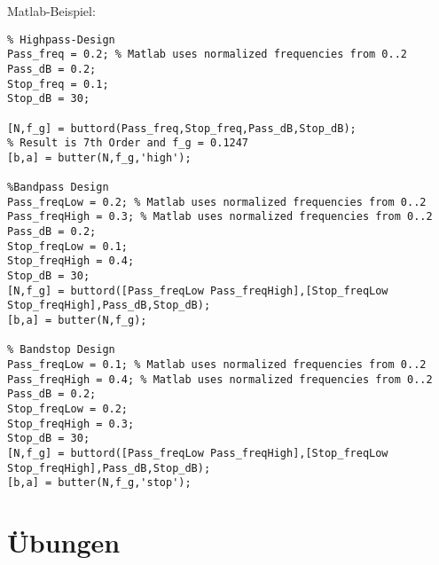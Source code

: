 Matlab-Beispiel:

\begin{verbatim}
% Highpass-Design
Pass_freq = 0.2; % Matlab uses normalized frequencies from 0..2
Pass_dB = 0.2;
Stop_freq = 0.1;
Stop_dB = 30;

[N,f_g] = buttord(Pass_freq,Stop_freq,Pass_dB,Stop_dB);
% Result is 7th Order and f_g = 0.1247
[b,a] = butter(N,f_g,'high');

%Bandpass Design
Pass_freqLow = 0.2; % Matlab uses normalized frequencies from 0..2
Pass_freqHigh = 0.3; % Matlab uses normalized frequencies from 0..2
Pass_dB = 0.2;
Stop_freqLow = 0.1;
Stop_freqHigh = 0.4;
Stop_dB = 30;
[N,f_g] = buttord([Pass_freqLow Pass_freqHigh],[Stop_freqLow Stop_freqHigh],Pass_dB,Stop_dB);
[b,a] = butter(N,f_g);

% Bandstop Design
Pass_freqLow = 0.1; % Matlab uses normalized frequencies from 0..2
Pass_freqHigh = 0.4; % Matlab uses normalized frequencies from 0..2
Pass_dB = 0.2;
Stop_freqLow = 0.2;
Stop_freqHigh = 0.3;
Stop_dB = 30;
[N,f_g] = buttord([Pass_freqLow Pass_freqHigh],[Stop_freqLow Stop_freqHigh],Pass_dB,Stop_dB);
[b,a] = butter(N,f_g,'stop');

\end{verbatim}



\section{Übungen}
